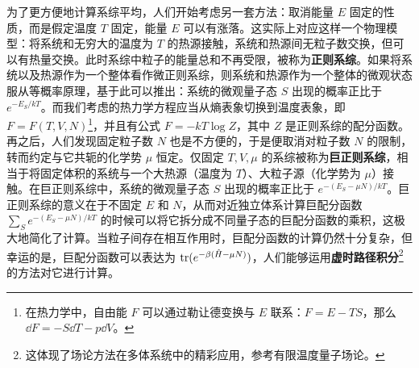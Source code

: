 为了更方便地计算系综平均，人们开始考虑另一套方法：取消能量 $E$ 固定的性质，而是假定温度 $T$ 固定，能量 $E$ 可以有涨落。这实际上对应这样一个物理模型：将系统和无穷大的温度为 $T$ 的热源接触，系统和热源间无粒子数交换，但可以有热量交换。此时系综中粒子的能量总和不再受限，被称为\textbf{正则系综}。如果将系统以及热源作为一个整体看作微正则系综，则系统和热源作为一个整体的微观状态服从等概率原理，基于此可以推出：系统的微观量子态 $S$ 出现的概率正比于 $e^{-E_S/kT}$。而我们考虑的热力学方程应当从熵表象切换到温度表象，即 $F=F(T,V,N)$\footnote{在热力学中，自由能 $F$ 可以通过勒让德变换与 $E$ 联系：$F=E-TS$，那么 $\dd F=-S\dd T-p\dd V$。}，并且有公式 $F=-kT\log Z$，其中 $Z$ 是正则系综的配分函数。再之后，人们发现固定粒子数 $N$ 也是不方便的，于是便取消对粒子数 $N$ 的限制，转而约定与它共轭的化学势 $\mu$ 恒定。仅固定 $T,V,\mu$ 的系综被称为\textbf{巨正则系综}，相当于将固定体积的系统与一个大热源（温度为 $T$）、大粒子源（化学势为 $\mu$）接触。在巨正则系综中，系统的微观量子态 $S$ 出现的概率正比于 $e^{-(E_S-\mu N)/kT}$。巨正则系综的意义在于不固定 $E$ 和 $N$，从而对近独立体系计算巨配分函数 $\sum_S e^{-(E_S-\mu N)/kT}$ 的时候可以将它拆分成不同量子态的巨配分函数的乘积，这极大地简化了计算。当粒子间存在相互作用时，巨配分函数的计算仍然十分复杂，但幸运的是，巨配分函数可以表达为 ${\rm tr} (e^{-\beta(\hat H-\mu N)})$，人们能够运用\textbf{虚时路径积分}\footnote{这体现了场论方法在多体系统中的精彩应用，参考有限温度量子场论。}的方法对它进行计算。
